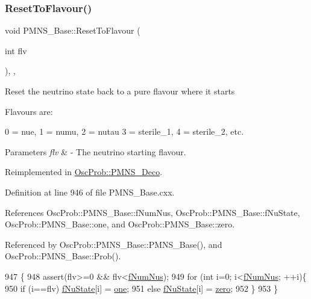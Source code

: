 \subsubsection{\texorpdfstring{Reset\+To\+Flavour()}{ResetToFlavour()}}
{\footnotesize\ttfamily void P\+M\+N\+S\+\_\+\+Base\+::\+Reset\+To\+Flavour (\begin{DoxyParamCaption}\item[{int}]{flv }\end{DoxyParamCaption})\hspace{0.3cm}{\ttfamily [protected]}, {\ttfamily [virtual]}, {\ttfamily [inherited]}}

Reset the neutrino state back to a pure flavour where it starts

Flavours are\+: 
\begin{DoxyPre}
  0 = nue, 1 = numu, 2 = nutau
  3 = sterile\_1, 4 = sterile\_2, etc.
\end{DoxyPre}
 
\begin{DoxyParams}{Parameters}
{\em flv} & -\/ The neutrino starting flavour. \\
\hline
\end{DoxyParams}


Reimplemented in \hyperlink{classOscProb_1_1PMNS__Deco_a393940f176614e3ffebeea40cfe78a62}{Osc\+Prob\+::\+P\+M\+N\+S\+\_\+\+Deco}.



Definition at line 946 of file P\+M\+N\+S\+\_\+\+Base.\+cxx.



References Osc\+Prob\+::\+P\+M\+N\+S\+\_\+\+Base\+::f\+Num\+Nus, Osc\+Prob\+::\+P\+M\+N\+S\+\_\+\+Base\+::f\+Nu\+State, Osc\+Prob\+::\+P\+M\+N\+S\+\_\+\+Base\+::one, and Osc\+Prob\+::\+P\+M\+N\+S\+\_\+\+Base\+::zero.



Referenced by Osc\+Prob\+::\+P\+M\+N\+S\+\_\+\+Base\+::\+P\+M\+N\+S\+\_\+\+Base(), and Osc\+Prob\+::\+P\+M\+N\+S\+\_\+\+Base\+::\+Prob().


\begin{DoxyCode}
947 \{
948   assert(flv>=0 && flv<\hyperlink{classOscProb_1_1PMNS__Base_a24bb74bed63569dfe88b18fa6a08060e}{fNumNus});
949   \textcolor{keywordflow}{for} (\textcolor{keywordtype}{int} i=0; i<\hyperlink{classOscProb_1_1PMNS__Base_a24bb74bed63569dfe88b18fa6a08060e}{fNumNus}; ++i)\{
950     \textcolor{keywordflow}{if} (i==flv) \hyperlink{classOscProb_1_1PMNS__Base_ad38a7107c3ab393591fd5ba21658300b}{fNuState}[i] = \hyperlink{classOscProb_1_1PMNS__Base_ab64aab27448a5aca27565c991a9d173e}{one};
951     \textcolor{keywordflow}{else}        \hyperlink{classOscProb_1_1PMNS__Base_ad38a7107c3ab393591fd5ba21658300b}{fNuState}[i] = \hyperlink{classOscProb_1_1PMNS__Base_a5c31ed4593cf95feb36fb80c1850d25e}{zero};
952   \}
953 \}
\end{DoxyCode}
\mbox{\label{classOscProb_1_1PMNS__Base_aae18afd69074211335f49ec40e6011b9}} 
